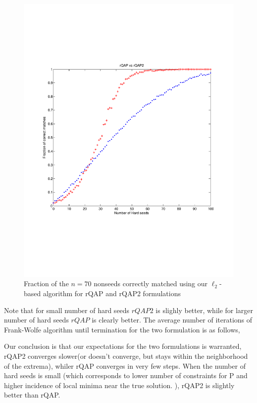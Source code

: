 \documentclass[12pt]{article}
\begin{document}
\begin{figure}
 \centering
  \caption{Fraction of the $n=70$ nonseeds correctly matched using our $\ell_2$-based algorithm for rQAP and rQAP2 formulations
 \label{figell2}}
 \includegraphics[width=1.2\textwidth]{rQAP_vs_rQAP2-alotmore.pdf}
\end{figure}
Note that for small number of hard seeds $rQAP2$ is slighly better, while for larger number of hard seeds $rQAP$ is clearly better. The average number of iterations of Frank-Wolfe algorithm until termination for the two formulation is as follows,

Our conclusion is that our expectations for the two formulations is warranted, rQAP2   converges slower(or doesn't converge, but stays within the neighborhood of the extrema), whiler rQAP converges in very few steps. When the number of hard seeds is small (which corresponds to lower number of constraints for P and higher incidence of local minima near the true solution. ), rQAP2 is slightly better than rQAP.
\end{document}
